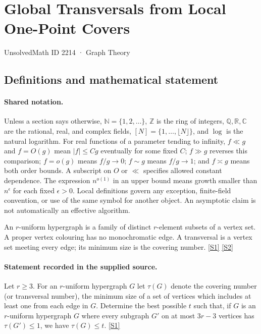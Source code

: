 \documentclass[11pt,a4paper]{article}
\newcommand{\N}{\mathbb{N}}
\newcommand{\Z}{\mathbb{Z}}
\newcommand{\Q}{\mathbb{Q}}
\newcommand{\R}{\mathbb{R}}
\newcommand{\C}{\mathbb{C}}
\newcommand{\sref}[2]{\hyperlink{source:#1:#2}{[S#2]}}
\begin{document}

\setcounter{section}{2213}

\section{Global Transversals from Local One-Point Covers}\label{2214}

{\small\sffamily UnsolvedMath ID 2214 · Graph Theory}

\subsection{Definitions and mathematical statement}

\paragraph{Shared notation.}Unless a section says otherwise, $\N=\{1,2,\ldots\}$,
$\Z$ is the ring of integers, $\Q,\R,\C$ are the rational, real, and complex
fields, $[N]=\{1,\ldots,\lfloor N\rfloor\}$, and $\log$ is the natural
logarithm. For real functions of a parameter tending to infinity,
$f\ll g$ and $f=O(g)$ mean $|f|\leq Cg$ eventually for some fixed $C$;
$f\gg g$ reverses this comparison; $f=o(g)$ means $f/g\to0$;
$f\sim g$ means $f/g\to1$; and $f\asymp g$ means both order bounds.
A subscript on $O$ or $\ll$ specifies allowed constant dependence.
The expression $n^{o(1)}$ in an upper bound means growth smaller than
$n^\epsilon$ for each fixed $\epsilon>0$. Local definitions govern any
exception, finite-field convention, or use of the same symbol for another
object. An asymptotic claim is not automatically an effective algorithm.



An $r$-uniform hypergraph is a family of distinct $r$-element subsets of a vertex set. A proper vertex colouring has no monochromatic edge. A transversal is a vertex set meeting every edge; its minimum size is the covering number. \sref{2214}{1} \sref{2214}{2}

\paragraph{Statement recorded in the supplied source.}
Let $r\geq 3$. For an $r$-uniform hypergraph $G$ let $\tau(G)$ denote the covering number (or transversal number), the minimum size of a set of vertices which includes at least one from each edge in $G$.
Determine the best possible $t$ such that, if $G$ is an $r$-uniform hypergraph $G$ where every subgraph $G'$ on at most $3r-3$ vertices has $\tau(G')\leq 1$, we have $\tau(G)\leq t$. \sref{2214}{1}
\end{document}
